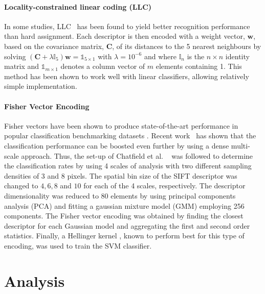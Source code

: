 \paragraph{Locality-constrained linear coding (LLC)} 
In some studies, LLC~\cite{Wang2010} has been found to yield better recognition performance than hard assignment. Each descriptor is then encoded with a weight vector, $\mathbf{w}$, based on the covariance matrix, $\mathbf{C}$, of its distances to the 5 nearest neighbours by solving $(\mathbf{C} + \lambda \mathbb{I}_{5})\mathbf{w} = \mathds{1}_{5\times 1}$ with $\lambda=10^{-6}$ and where $\mathbb{I}_n$ is the $n\times n$ identity matrix and $\mathds{1}_{m\times 1}$ denotes a column vector of $m$ elements containing 1. This method has been shown to work well with linear classifiers, allowing relatively simple implementation.


\paragraph{Fisher Vector Encoding} 
Fisher vectors have been shown to produce state-of-the-art performance in popular classification benchmarking datasets \cite{Chatfield2011}. Recent work~\cite{Perronnin2010} has shown that the classification performance can be boosted even further by using a dense multi-scale approach. Thus, the set-up of Chatfield et al. ~\cite{Chatfield2011} was followed to determine the classification rates by using 4 scales of analysis with two different sampling densities of 3 and 8 pixels. The spatial bin size of the SIFT descriptor was changed to $4,6,8$ and $10$ for each of the 4 scales, respectively. The descriptor dimensionality was reduced to 80 elements by using principal components analysis (PCA) and fitting a gaussian mixture model (GMM) employing 256 components. The Fisher vector encoding was obtained by finding the closest descriptor for each Gaussian model and aggregating the first and second order statistics. Finally, a Hellinger kernel \cite{Chatfield2011}, known to perform best for this type of encoding, was used to train the SVM classifier.



\section{Analysis} \label{sec:analysis}

